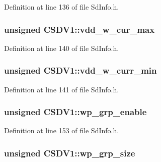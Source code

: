 Definition at line 136 of file Sd\+Info.\+h.

\subsubsection[{\texorpdfstring{vdd\+\_\+w\+\_\+cur\+\_\+max}{vdd\_w\_cur\_max}}]{\setlength{\rightskip}{0pt plus 5cm}unsigned C\+S\+D\+V1\+::vdd\+\_\+w\+\_\+cur\+\_\+max}\hypertarget{struct_c_s_d_v1_aea850ac333645608af63e69bcf4e27b3}{}\label{struct_c_s_d_v1_aea850ac333645608af63e69bcf4e27b3}


Definition at line 140 of file Sd\+Info.\+h.

\subsubsection[{\texorpdfstring{vdd\+\_\+w\+\_\+curr\+\_\+min}{vdd\_w\_curr\_min}}]{\setlength{\rightskip}{0pt plus 5cm}unsigned C\+S\+D\+V1\+::vdd\+\_\+w\+\_\+curr\+\_\+min}\hypertarget{struct_c_s_d_v1_ac9c6e2a080c566408d4a1d372f9a4072}{}\label{struct_c_s_d_v1_ac9c6e2a080c566408d4a1d372f9a4072}


Definition at line 141 of file Sd\+Info.\+h.

\subsubsection[{\texorpdfstring{wp\+\_\+grp\+\_\+enable}{wp\_grp\_enable}}]{\setlength{\rightskip}{0pt plus 5cm}unsigned C\+S\+D\+V1\+::wp\+\_\+grp\+\_\+enable}\hypertarget{struct_c_s_d_v1_a0fedbc5c0834d12ffcbedca0caaea22b}{}\label{struct_c_s_d_v1_a0fedbc5c0834d12ffcbedca0caaea22b}


Definition at line 153 of file Sd\+Info.\+h.

\subsubsection[{\texorpdfstring{wp\+\_\+grp\+\_\+size}{wp\_grp\_size}}]{\setlength{\rightskip}{0pt plus 5cm}unsigned C\+S\+D\+V1\+::wp\+\_\+grp\+\_\+size}\hypertarget{struct_c_s_d_v1_a7c053e453c019206686f66c08f7b8d10}{}\label{struct_c_s_d_v1_a7c053e453c019206686f66c08f7b8d10}



